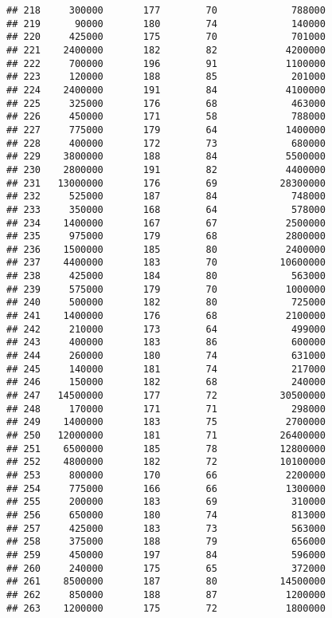 \documentclass[
]{article}
\begin{document}
\begin{verbatim}
## 218     300000       177        70             788000
## 219      90000       180        74             140000
## 220     425000       175        70             701000
## 221    2400000       182        82            4200000
## 222     700000       196        91            1100000
## 223     120000       188        85             201000
## 224    2400000       191        84            4100000
## 225     325000       176        68             463000
## 226     450000       171        58             788000
## 227     775000       179        64            1400000
## 228     400000       172        73             680000
## 229    3800000       188        84            5500000
## 230    2800000       191        82            4400000
## 231   13000000       176        69           28300000
## 232     525000       187        84             748000
## 233     350000       168        64             578000
## 234    1400000       167        67            2500000
## 235     975000       179        68            2800000
## 236    1500000       185        80            2400000
## 237    4400000       183        70           10600000
## 238     425000       184        80             563000
## 239     575000       179        70            1000000
## 240     500000       182        80             725000
## 241    1400000       176        68            2100000
## 242     210000       173        64             499000
## 243     400000       183        86             600000
## 244     260000       180        74             631000
## 245     140000       181        74             217000
## 246     150000       182        68             240000
## 247   14500000       177        72           30500000
## 248     170000       171        71             298000
## 249    1400000       183        75            2700000
## 250   12000000       181        71           26400000
## 251    6500000       185        78           12800000
## 252    4800000       182        72           10100000
## 253     800000       170        66            2200000
## 254     775000       166        66            1300000
## 255     200000       183        69             310000
## 256     650000       180        74             813000
## 257     425000       183        73             563000
## 258     375000       188        79             656000
## 259     450000       197        84             596000
## 260     240000       175        65             372000
## 261    8500000       187        80           14500000
## 262     850000       188        87            1200000
## 263    1200000       175        72            1800000

\end{verbatim}
\end{document}
